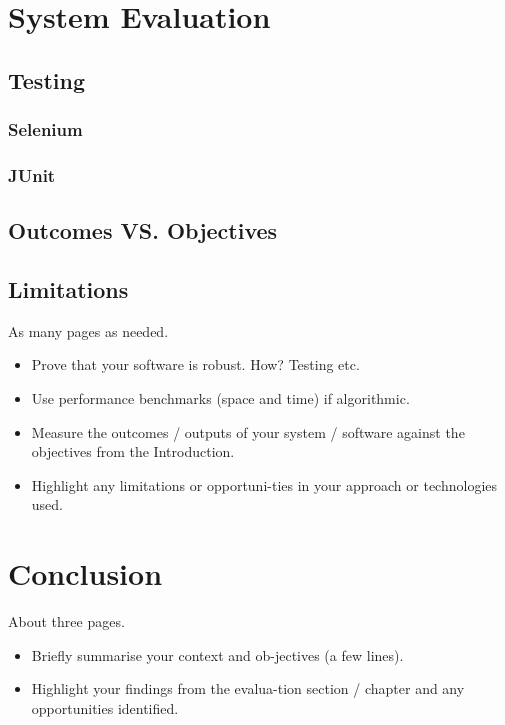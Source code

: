 \chapter{System Evaluation}

\section{Testing}

\subsection{Selenium}

\subsection{JUnit}

\section{Outcomes VS. Objectives}

\section{Limitations}

As many pages as needed.
\begin{itemize}
\item Prove that your software is robust. How? Testing etc. 
\item Use performance benchmarks (space and time) if algorithmic.
\item Measure the outcomes / outputs of your system / software against the objectives from the Introduction.
\item Highlight any limitations or opportuni-ties in your approach or technologies used.
\end{itemize}

\chapter{Conclusion}
About three pages.

\begin{itemize}
\item Briefly summarise your context and ob-jectives (a few lines).
\item Highlight your findings from the evalua-tion section / chapter and any opportunities identified.
\end{itemize}